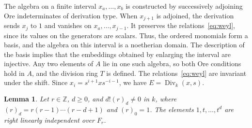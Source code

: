 \documentclass[11pt,a4paper,reqno]{amsart}
\numberwithin{equation}{section}
\newtheorem{lemma}[theorem]{Lemma}
\theoremstyle{remark}
\newcommand{\Div}{\operatorname{Div}_k}
\newcommand{\Z}{\mathbb Z}
\begin{document}
The algebra on a finite interval $x_a,\ldots,x_b$ is constructed by successively
adjoining Ore indeterminates of derivation type. When
$x_{j+1}$ is adjoined, the derivation sends $x_j$ to $1$ and vanishes
on $x_a,\ldots,x_{j-1}$. It preserves the relations~\eqref{eq:weyl},
since its values on the generators are scalars. Thus,
the ordered monomials form a basis, and the algebra on this interval is a noetherian
domain. The description of the basis implies that the embeddings obtained by
enlarging the interval are injective. Any two elements of $A$ lie in one such algebra,
so both Ore conditions hold in $A$, and the division ring $T$ is defined.
The relations~\eqref{eq:weyl} are invariant under the shift.
Since $x_i=s^{i+1}xs^{-i-1}$, we have $E=\Div(x,s)$.

\begin{lemma}\label{lem:ind}
Let $r\in\Z$, $d\ge0$, and $d!(r)_d\ne0$ in $k$, where
$(r)_d=r(r-1)\cdots(r-d+1)$ and $(r)_0=1$. The elements $1,t,\ldots,t^d$
are right linearly independent over $F_r$.
\end{lemma}
\end{document}
